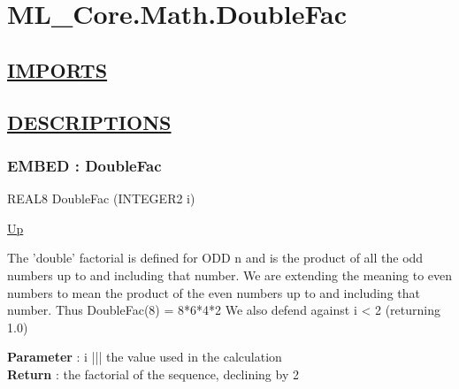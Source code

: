 \chapter*{ML\_Core.Math.DoubleFac}
\hypertarget{ecldoc:toc:ML_Core.Math.DoubleFac}{}

\section*{\underline{IMPORTS}}

\section*{\underline{DESCRIPTIONS}}
\subsection*{EMBED : DoubleFac}
\hypertarget{ecldoc:ml_core.math.doublefac}{}
\begin{minipage}[t]{\textwidth}
\begin{flushleft}
REAL8 DoubleFac (INTEGER2 i)
\end{flushleft}
\end{minipage}
\hyperlink{ecldoc:toc:ML_Core/Math}{Up}

\par
The 'double' factorial is defined for ODD n and is the product of all the odd numbers up to and including that number. We are extending the meaning to even numbers to mean the product of the even numbers up to and including that number. Thus DoubleFac(8) = 8*6*4*2 We also defend against i < 2 (returning 1.0)
\par
\textbf{Parameter} : i ||| the value used in the calculation \\
\textbf{Return} : the factorial of the sequence, declining by 2 \\

